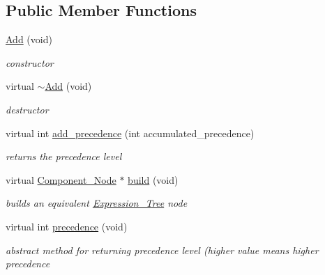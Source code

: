 \subsection*{Public Member Functions}
\begin{DoxyCompactItemize}
\item 
\hyperlink{classMadara_1_1Expression__Tree_1_1Add_a916ae144e134ce815b52e44976b2e590}{Add} (void)
\begin{DoxyCompactList}\small\item\em constructor \item\end{DoxyCompactList}\item 
virtual \hyperlink{classMadara_1_1Expression__Tree_1_1Add_a3af7b198a17988bb1693f205213bf630}{$\sim$Add} (void)
\begin{DoxyCompactList}\small\item\em destructor \item\end{DoxyCompactList}\item 
virtual int \hyperlink{classMadara_1_1Expression__Tree_1_1Add_a79214e435ce76ea609ba5a473810bf76}{add\_\-precedence} (int accumulated\_\-precedence)
\begin{DoxyCompactList}\small\item\em returns the precedence level \item\end{DoxyCompactList}\item 
virtual \hyperlink{classMadara_1_1Expression__Tree_1_1Component__Node}{Component\_\-Node} $\ast$ \hyperlink{classMadara_1_1Expression__Tree_1_1Add_afd2a07f3a28b5e2c4da81c7af6d12622}{build} (void)
\begin{DoxyCompactList}\small\item\em builds an equivalent \hyperlink{classMadara_1_1Expression__Tree_1_1Expression__Tree}{Expression\_\-Tree} node \item\end{DoxyCompactList}\item 
virtual int \hyperlink{classMadara_1_1Expression__Tree_1_1Symbol_ac060dedb8d16864591b259df375109b3}{precedence} (void)
\begin{DoxyCompactList}\small\item\em abstract method for returning precedence level (higher value means higher precedence \item\end{DoxyCompactList}\end{DoxyCompactItemize}
